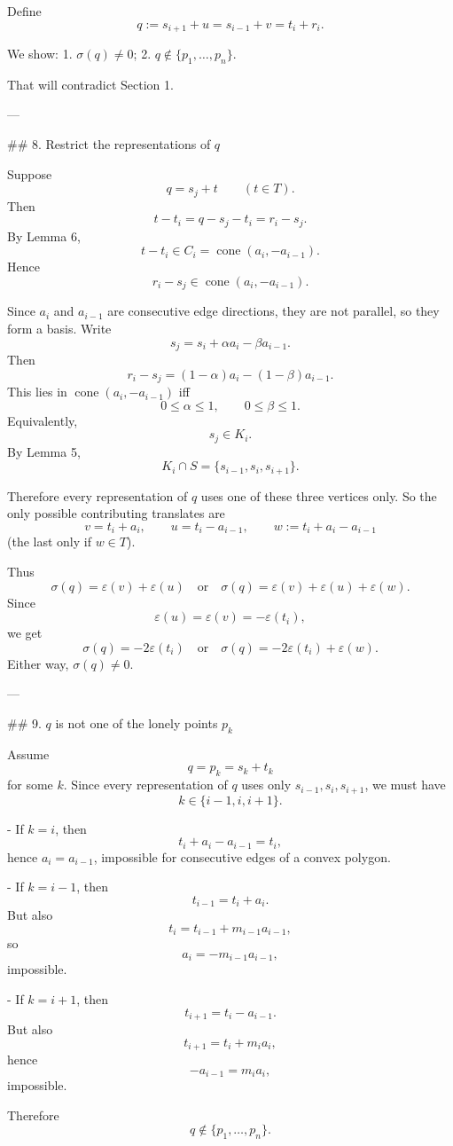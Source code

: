 Define
\[
q:=s_{i+1}+u=s_{i-1}+v=t_i+r_i.
\]

We show:
1. \(\sigma(q)\neq0\);
2. \(q\notin\{p_1,\dots,p_n\}\).

That will contradict Section 1.

---

## 8. Restrict the representations of \(q\)

Suppose
\[
q=s_j+t\qquad (t\in T).
\]
Then
\[
t-t_i=q-s_j-t_i=r_i-s_j.
\]
By Lemma 6,
\[
t-t_i\in C_i=\operatorname{cone}(a_i,-a_{i-1}).
\]
Hence
\[
r_i-s_j\in \operatorname{cone}(a_i,-a_{i-1}).
\]

Since \(a_i\) and \(a_{i-1}\) are consecutive edge directions, they are not parallel, so they form a basis. Write
\[
s_j=s_i+\alpha a_i-\beta a_{i-1}.
\]
Then
\[
r_i-s_j=(1-\alpha)a_i-(1-\beta)a_{i-1}.
\]
This lies in \(\operatorname{cone}(a_i,-a_{i-1})\) iff
\[
0\le\alpha\le1,\qquad 0\le\beta\le1.
\]
Equivalently,
\[
s_j\in K_i.
\]
By Lemma 5,
\[
K_i\cap S=\{s_{i-1},s_i,s_{i+1}\}.
\]

Therefore every representation of \(q\) uses one of these three vertices only. So the only possible contributing translates are
\[
v=t_i+a_i,\qquad
u=t_i-a_{i-1},\qquad
w:=t_i+a_i-a_{i-1}
\]
(the last only if \(w\in T\)).

Thus
\[
\sigma(q)=\varepsilon(v)+\varepsilon(u)
\quad\text{or}\quad
\sigma(q)=\varepsilon(v)+\varepsilon(u)+\varepsilon(w).
\]
Since
\[
\varepsilon(u)=\varepsilon(v)=-\varepsilon(t_i),
\]
we get
\[
\sigma(q)=-2\varepsilon(t_i)
\quad\text{or}\quad
\sigma(q)=-2\varepsilon(t_i)+\varepsilon(w).
\]
Either way, \(\sigma(q)\neq0\).

---

## 9. \(q\) is not one of the lonely points \(p_k\)

Assume
\[
q=p_k=s_k+t_k
\]
for some \(k\). Since every representation of \(q\) uses only \(s_{i-1},s_i,s_{i+1}\), we must have
\[
k\in\{i-1,i,i+1\}.
\]

- If \(k=i\), then
  \[
  t_i+a_i-a_{i-1}=t_i,
  \]
  hence \(a_i=a_{i-1}\), impossible for consecutive edges of a convex polygon.

- If \(k=i-1\), then
  \[
  t_{i-1}=t_i+a_i.
  \]
  But also
  \[
  t_i=t_{i-1}+m_{i-1}a_{i-1},
  \]
  so
  \[
  a_i=-m_{i-1}a_{i-1},
  \]
  impossible.

- If \(k=i+1\), then
  \[
  t_{i+1}=t_i-a_{i-1}.
  \]
  But also
  \[
  t_{i+1}=t_i+m_i a_i,
  \]
  hence
  \[
  -a_{i-1}=m_i a_i,
  \]
  impossible.

Therefore
\[
q\notin\{p_1,\dots,p_n\}.
\]

